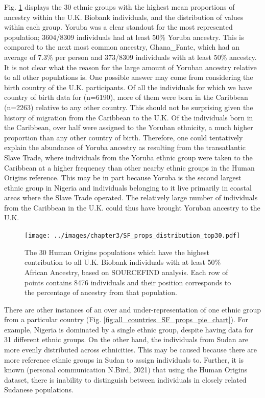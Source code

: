 Fig. \ref{fig:SF_props_distribution_top30} displays the 30 ethnic groups with the highest mean proportions of ancestry within the U.K. Biobank individuals, and the distribution of values within each group. Yoruba was a clear standout for the most represented population;  3604/8309 individuals had at least 50\% Yoruba ancestry. This is compared to the next most common ancestry, Ghana\_Fante, which had an average of 7.3\% per person and 373/8309 individuals with at least 50\% ancestry. It is not clear what the reason for the large amount of Yoruban ancestry relative to all other populations is. One possible answer may come from considering the birth country of the U.K. participants. Of all the individuals for which we have country of birth data for (n=6190), more of them were born in the Caribbean (n=2263) relative to any other country. This should not be surprising given the history of migration from the Caribbean to the U.K. Of the individuals born in the Caribbean, over half were assigned to the Yoruban ethnicity, a much higher proportion than any other country of birth. Therefore, one could tentatively explain the abundance of Yoruba ancestry as resulting from the transatlantic Slave Trade, where individuals from the Yoruba ethnic group were taken to the Caribbean at a higher frequency than other nearby ethnic groups in the Human Origins reference. This may be in part because Yoruba is the second largest ethnic group in Nigeria and individuals belonging to it live primarily in coastal areas where the Slave Trade operated. The relatively large number of individuals from the Caribbean in the U.K. could thus have brought Yoruban ancestry to the U.K. 

\begin{figure}[htp]
    \centering
    \texttt{[image: ../images/chapter3/SF\_props\_distribution\_top30.pdf]}
    \caption{The 30 Human Origins populations which have the highest contribution to all U.K. Biobank individuals with at least 50\% African Ancestry, based on SOURCEFIND analysis. Each row of points contains 8476 individuals and their position corresponds to the percentage of ancestry from that population. }
    \label{fig:SF_props_distribution_top30}
\end{figure}

There are other instances of an over and under-representation of one ethnic group from a particular country (Fig. \ref{fig:all_countries_SF_props_pie_chart}). For example, Nigeria is dominated by a single ethnic group, despite having data for 31 different ethnic groups.  On the other hand, the individuals from Sudan are more evenly distributed across ethnicities. This may be caused because there are more reference ethnic groups in Sudan to assign individuals to. Further, it is known (personal communication N.Bird, 2021) that using the Human Origins dataset, there is inability to distinguish  between individuals in closely related Sudanese populations. 

